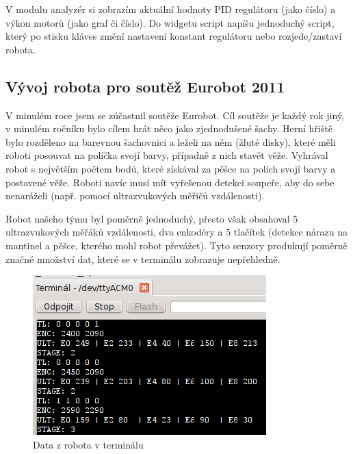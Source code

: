 \documentclass[12pt, a4paper, oneside]{article}
\begin{document}
V modulu analyzér si zobrazím aktuální hodnoty PID regulátoru (jako číslo) a výkon motorů (jako graf či číslo). Do widgetu script napíšu jednoduchý script, který po stisku kláves změní nastavení konstant regulátoru nebo rozjede/zastaví robota.

\newpage
\subsection{Vývoj robota pro soutěž Eurobot 2011}
V minulém roce jsem se zúčastnil soutěže Eurobot\cite{eurobot}. Cíl soutěže je každý rok jiný, v minulém ročníku bylo cílem hrát něco jako zjednodušené šachy. Herní hřiště bylo rozděleno na barevnou šachovnici a leželi na něm  (žluté disky), které měli roboti posouvat na políčka svojí barvy, případně z nich stavět věže. Vyhrával robot s největším počtem bodů, které získával za pěšce na polích svojí barvy a postavené věže. Roboti navíc musí mít vyřešenou detekci soupeře, aby do sebe nenaráželi (např. pomocí ultrazvukových měřičů vzdálenosti).

Robot našeho týmu byl poměrně jednoduchý, přesto však obsahoval 5 ultrazvukových měřáků vzdálenosti, dva enkodéry a 5 tlačítek (detekce nárazu na mantinel a pěšce, kterého mohl robot převážet). Tyto senzory produkují poměrně značné množství dat, které se v terminálu zobrazuje nepřehledně.

\begin{figure}[h]
\begin{center}
\includegraphics{img/use_david1.png}
\caption{Data z robota v terminálu}
\end{center}
\end{figure}
\end{document}
